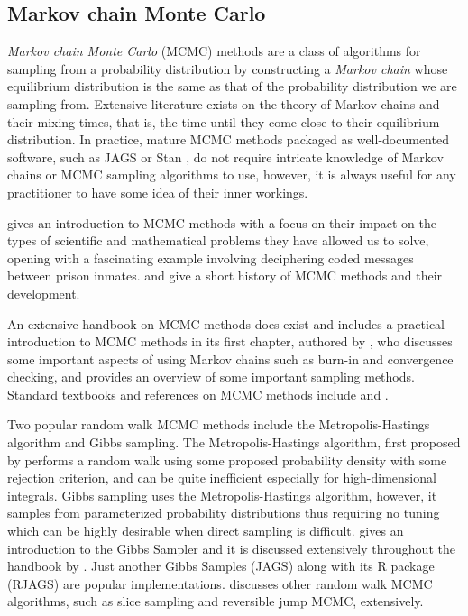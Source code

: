 \subsection{Markov chain Monte Carlo}
\emph{Markov chain Monte Carlo} (MCMC) methods are a class of algorithms for sampling from a probability distribution by constructing a \emph{Markov chain} whose equilibrium distribution is the same as that of the probability distribution we are sampling from. Extensive literature exists on the theory of Markov chains \citep{Levin09} and their mixing times, that is, the time until they come close to their equilibrium distribution. In practice, mature MCMC methods packaged as well-documented software, such as JAGS \citep{Plummer03} or Stan \citep{Carpenter17}, do not require intricate knowledge of Markov chains or MCMC sampling algorithms to use, however, it is always useful for any practitioner to have some idea of their inner workings.

\citet{Diaconis09} gives an introduction to MCMC methods with a focus on their impact on the types of scientific and mathematical problems they have allowed us to solve, opening with a fascinating example involving deciphering coded messages between prison inmates. \citet{Richey10} and \citet{Robert11} give a short history of MCMC methods and their development.

An extensive handbook on MCMC methods does exist \citep{Brooks11} and includes a practical introduction to MCMC methods in its first chapter, authored by \citet{Geyer11}, who discusses some important aspects of using Markov chains such as burn-in and convergence checking, and provides an overview of some important sampling methods. Standard textbooks and references on MCMC methods include \citet{Gilks95} and \citet{Christian99}.

Two popular random walk MCMC methods include the Metropolis-Hastings algorithm and Gibbs sampling. The Metropolis-Hastings algorithm, first proposed by \citet{Metropolis53} performs a random walk using some proposed probability density with some rejection criterion, and can be quite inefficient especially for high-dimensional integrals. Gibbs sampling uses the Metropolis-Hastings algorithm, however, it samples from parameterized probability distributions thus requiring no tuning which can be highly desirable when direct sampling is difficult. \citet{Casella92} gives an introduction to the Gibbs Sampler and it is discussed extensively throughout the handbook by \citet{Brooks11}. Just another Gibbs Samples (JAGS) \citep{Plummer03} along with its R package (RJAGS) are popular implementations. \citet{Brooks11} discusses other random walk MCMC algorithms, such as slice sampling and reversible jump MCMC, extensively.

